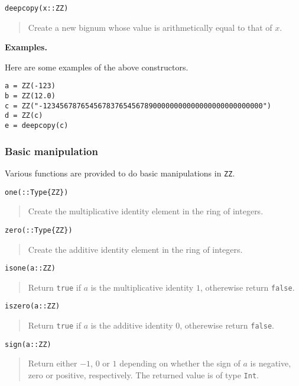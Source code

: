 \documentclass[a4paper,10pt]{article}
\newcommand{\code}{\lstinline}
\newcommand{\desc}[1]{\vspace{-3mm}\begin{quote}#1\end{quote}}
\begin{document}
{\begin{lstlisting}
deepcopy(x::ZZ)
\end{lstlisting}

\desc{Create a new bignum whose value is arithmetically equal to that of $x$.}

\textbf{Examples.}

Here are some examples of the above constructors.

\begin{lstlisting}
a = ZZ(-123)
b = ZZ(12.0)
c = ZZ("-1234567876545678376545678900000000000000000000000000")
d = ZZ(c)
e = deepcopy(c)
\end{lstlisting}

\subsubsection{Basic manipulation}

Various functions are provided to do basic manipulations in \code{ZZ}.

\begin{lstlisting}
one(::Type{ZZ})
\end{lstlisting}

\desc{Create the multiplicative identity element in the ring of integers.}

\begin{lstlisting}
zero(::Type{ZZ})
\end{lstlisting}

\desc{Create the additive identity element in the ring of integers.}

\begin{lstlisting}
isone(a::ZZ)
\end{lstlisting}

\desc{Return \code{true} if $a$ is the multiplicative identity $1$, otherewise
return \code{false}.}

\begin{lstlisting}
iszero(a::ZZ)
\end{lstlisting}

\desc{Return \code{true} if $a$ is the additive identity $0$, otherewise
return \code{false}.}

\begin{lstlisting}
sign(a::ZZ)
\end{lstlisting}

\desc{Return either $-1$, $0$ or $1$ depending on whether the sign of $a$ is negative,
zero or positive, respectively. The returned value is of type \code{Int}.}

}
\end{document}
